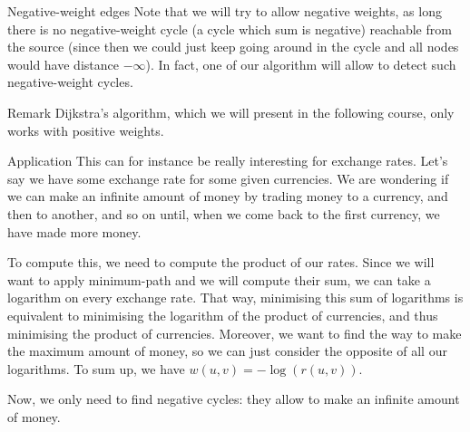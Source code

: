 \documentclass[a4paper]{article}
\begin{document}
\begin{parag}{Negative-weight edges}
    Note that we will try to allow negative weights, as long there is no negative-weight cycle (a cycle which sum is negative) reachable from the source (since then we could just keep going around in the cycle and all nodes would have distance $-\infty$). In fact, one of our algorithm will allow to detect such negative-weight cycles.

    \begin{subparag}{Remark}
        Dijkstra's algorithm, which we will present in the following course, only works with positive weights.
    \end{subparag}

    \begin{subparag}{Application}
        This can for instance be really interesting for exchange rates. Let's say we have some exchange rate for some given currencies. We are wondering if we can make an infinite amount of money by trading money to a currency, and then to another, and so on until, when we come back to the first currency, we have made more money.

        To compute this, we need to compute the product of our rates. Since we will want to apply minimum-path and we will compute their sum, we can take a logarithm on every exchange rate. That way, minimising this sum of logarithms is equivalent to minimising the logarithm of the product of currencies, and thus minimising the product of currencies. Moreover, we want to find the way to make the maximum amount of money, so we can just consider the opposite of all our logarithms. To sum up, we have $w\left(u, v\right) = -\log\left(r\left(u, v\right)\right)$.

        Now, we only need to find negative cycles: they allow to make an infinite amount of money.
    \end{subparag}
\end{parag}
\end{document}
